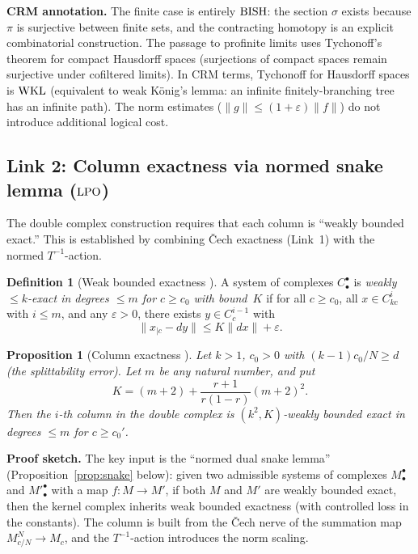 \documentclass[11pt,a4paper]{article}
\theoremstyle{plain}
\newtheorem{proposition}[theorem]{Proposition}
\theoremstyle{definition}
\newtheorem{definition}[theorem]{Definition}
\newcommand{\BISH}{\textup{BISH}}
\newcommand{\WKL}{\textup{WKL}}
\newcommand{\LPO}{\textup{LPO}}
\begin{document}
\medskip
\noindent\textbf{CRM annotation.}
The finite case is entirely $\BISH$: the section $\sigma$ exists
because $\pi$ is surjective between finite sets, and the contracting
homotopy is an explicit combinatorial construction.  The passage to
profinite limits uses Tychonoff's theorem for compact Hausdorff spaces
(surjections of compact spaces remain surjective under cofiltered
limits).  In CRM terms, Tychonoff for Hausdorff spaces is $\WKL$
(equivalent to weak K\"onig's lemma: an infinite finitely-branching
tree has an infinite path).  The norm estimates ($\|g\| \leq
(1+\varepsilon)\|f\|$) do not introduce additional logical cost.

\subsection{Link 2: Column exactness via normed snake lemma ($\LPO$)}

The double complex construction requires that each column is
``weakly bounded exact.''  This is established by combining
\v{C}ech exactness (Link~1) with the normed $T^{-1}$-action.

\begin{definition}[Weak bounded exactness {\cite{Commelin2022}}]
\label{def:weak-exact}
A system of complexes $C_\bullet^\bullet$ is
\emph{weakly $\leq k$-exact in degrees $\leq m$ for $c \geq c_0$
with bound~$K$} if for all $c \geq c_0$, all $x \in C_{kc}^i$ with
$i \leq m$, and any $\varepsilon > 0$, there exists $y \in C_c^{i-1}$
with
\[
  \|x_{|c} - dy\| \leq K\|dx\| + \varepsilon.
\]
\end{definition}

\begin{proposition}[Column exactness {\cite{Commelin2022}}]
\label{prop:col-exact}
Let $k > 1$, $c_0 > 0$ with $(k-1)c_0/N \geq d$ (the splittability
error).  Let $m$ be any natural number, and put
\[
  K = (m+2) + \frac{r+1}{r(1-r)}(m+2)^2.
\]
Then the $i$-th column in the double complex is $(k^2, K)$-weakly
bounded exact in degrees $\leq m$ for $c \geq c_0'$.
\end{proposition}

\noindent\textbf{Proof sketch.}
The key input is the ``normed dual snake lemma''
(Proposition~\ref{prop:snake} below): given two admissible systems of
complexes $M_\bullet^\bullet$ and ${M'}_\bullet^\bullet$ with a map
$f: M \to M'$, if both $M$ and $M'$ are weakly bounded exact, then
the kernel complex inherits weak bounded exactness (with controlled
loss in the constants).  The column is built from the Čech nerve of
the summation map $M^N_{c/N} \to M_c$, and the $T^{-1}$-action
introduces the norm scaling.
\end{document}
